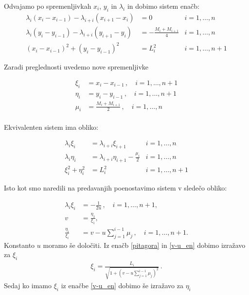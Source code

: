 \documentclass[a4paper,12pt]{article}
\begin{document}
Odvajamo po spremenljivkah $x_i$, $y_i$ in $\lambda_i$ in dobimo sistem enačb:
\begin{align*}
    \lambda_i (x_i - x_{i-1}) - \lambda_{i+i}(x_{i+1} - x_i) &= 0 \, & i = 1, \dots,n \\
    \lambda_i (y_i - y_{i-1}) - \lambda_{i+i}(y_{i+1} - y_i) &= - \frac{M_i + M_{i+1}}{4} & i = 1, \dots,n\\
    (x_i - x_{i-1})^2 + (y_i - y_{i-1})^2 &= L_i^2 \, & i = 1, \dots,n+1
\end{align*}

Zaradi preglednosti uvedemo nove spremenljivke

\begin{align*}
    \xi_i &= x_i - x_{i-1} \, , \quad  i = 1,\dots,n+1 \\
    \eta_i &= y_i - y_{i-1} \, , \quad  i = 1,\dots,n+1 \\
    \mu_i &= \frac{M_i + M_{i+1}}{2} \, , \quad  i = 1,\dots,n \\
\end{align*}

Ekvivalenten sistem ima obliko:

\begin{align}
    \lambda_i \xi_i &= \lambda_{i+i}\xi_{i+1} \, & i = 1, \dots,n \\
    \lambda_i \eta_i &= \lambda_{i+i}\eta_{i+1} - \frac{\mu_i}{2} & i = 1, \dots,n \\
    \xi_i^2 + \eta_i^2 &= L_i^2 \, & i = 1, \dots,n+1 \label{pitagora}
\end{align}

Isto kot smo naredili na predavanjih poenostavimo sistem v sledečo obliko:

\begin{align}
    \lambda_i \xi_i &= - \frac{1}{2u} \, , \quad  i = 1,\dots,n+1 ,\\[1.05em]
    v &= \frac{\eta_1}{\xi_1},\\
    \frac{\eta_i}{\xi_i} &= v - u \sum_{j=1}^{i-1}\mu_j \, , \quad  i = 1,\dots,n+1.  \label{v-u_en}
\end{align}
Konstanto $u$ moramo še določiti. Iz enačb \ref{pitagora} in \ref{v-u_en} dobimo
izražavo za $\xi_i$
\begin{align}
    \xi_i = \frac{L_i}{\sqrt{1 + (v - u \sum_{j=1}^{i-1}\mu_j)^2}} \,.
    \label{ksii}
\end{align}
Sedaj ko imamo $\xi_i$ iz enačbe \ref{v-u_en} dobimo še izražavo za $\eta_i$
\end{document}
